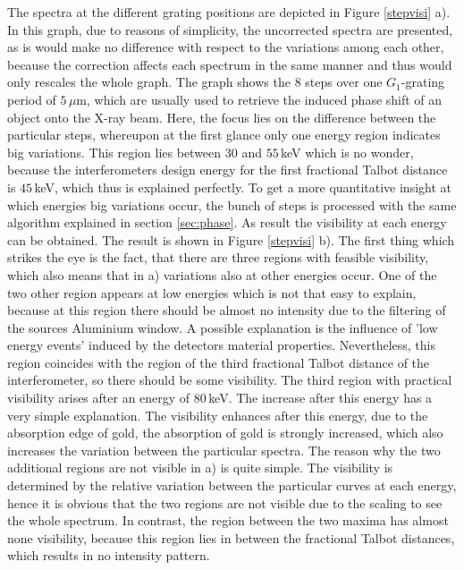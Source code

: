 The spectra at the different grating positions are depicted in Figure \ref{stepvisi} a). In this graph, due to reasons of simplicity, the uncorrected spectra are presented, as is would make no difference with respect to the variations among each other, because the correction affects each spectrum in the same manner and thus would only rescales the whole graph. The graph shows the $8$ steps over one $G_{1}$-grating period of $5\, \mu$m, which are usually used to retrieve the induced phase shift of an object onto the X-ray beam. Here, the focus lies on the difference between the particular steps, whereupon at the first glance only one energy region indicates big variations. This region lies between $30$ and $55\,$keV which is no wonder, because the interferometers design energy for the first fractional Talbot distance is $45\,$keV, which thus is explained perfectly. To get a more quantitative insight at which energies big variations occur, the bunch of steps is processed with the same algorithm explained in section \ref{sec:phase}. As result the visibility at each energy can be obtained. The result is shown in Figure \ref{stepvisi} b). The first thing which strikes the eye is the fact, that there are three regions with feasible visibility, which also means that in a) variations also at other energies occur. One of the two other region appears at low energies which is not that easy to explain, because at this region there should be almost no intensity due to the filtering of the sources Aluminium window. A possible explanation is the influence of 'low energy events' induced by the detectors material properties. Nevertheless, this region coincides with the region of the third fractional Talbot distance of the interferometer, so there should be some visibility. The third region with practical visibility arises after an energy of $80\,$keV. The increase after this energy has a very simple explanation. The visibility enhances after this energy, due to the absorption edge of gold, the absorption of gold is strongly increased, which also increases the variation between the particular spectra. The reason why the two additional regions are not visible in a) is quite simple. The visibility is determined by the relative variation between the particular curves at each energy, hence it is obvious that the two regions are not visible due to the scaling to see the whole spectrum. In contrast, the region between the two maxima has almost none visibility, because this region lies in between the fractional Talbot distances, which results in no intensity pattern.      


